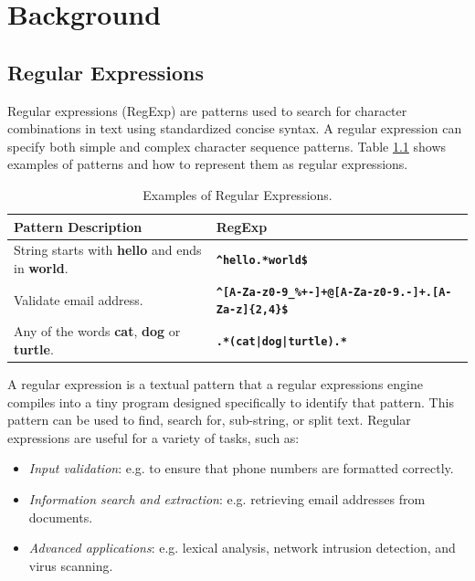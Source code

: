 \chapter{Background}\label{chapter:background}

\section{Regular Expressions}
Regular expressions (RegExp) are patterns used to search for character combinations in text using standardized concise syntax. A regular expression can specify both simple and complex character sequence patterns. Table \ref{tab:regexsamp} shows examples of patterns and how to represent them as regular expressions.

{\renewcommand{\arraystretch}{1.6}%
\begin{table}[H]
\centering
\begin{adjustbox}{width=1.1\textwidth,center=\textwidth}
\small
\begin{tabular}{|l|l|}
\hline
Pattern Description       & RegExp  \\
\hline
String starts with \textbf{hello} and ends in \textbf{world}. & \texttt{\textbf{\^{}hello.*world\$}} \\
\hline
Validate email address. & \texttt{\textbf{\^{}[A-Za-z0-9\_\%+-]+@[A-Za-z0-9.-]+.[A-Za-z]\{2,4\}\$}} \\
\hline
Any of the words \textbf{cat}, \textbf{dog} or \textbf{turtle}. & \texttt{\textbf{.*(cat|dog|turtle).*}}\\
\hline
\end{tabular}
\end{adjustbox}
\caption{Examples of Regular Expressions.}\label{tab:regexsamp}
\end{table}}

A regular expression is a textual pattern that a regular expressions engine compiles into a tiny program designed specifically to identify that pattern. This pattern can be used to find, search for, sub-string, or split text. Regular expressions are useful for a variety of tasks, such as:
 \begin{itemize}
     \item \textit{Input validation}: e.g. to ensure that phone numbers are formatted correctly.
     \item \textit{Information search and extraction}: e.g. retrieving email addresses from documents. \item \textit{Advanced applications}: e.g. lexical analysis, network intrusion detection, and virus scanning.
 \end{itemize}

